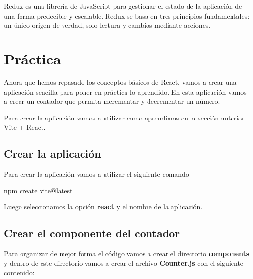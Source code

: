 \documentclass[
  a4paper,
  DIV=11,
  numbers=noendperiod,
  onepage,
  openany]{scrreprt}
\newenvironment{Shaded}{\begin{snugshade}}{\end{snugshade}}
\newcommand{\ExtensionTok}[1]{\textcolor[rgb]{0.00,0.23,0.31}{#1}}
\newcommand{\NormalTok}[1]{\textcolor[rgb]{0.00,0.23,0.31}{#1}}
\begin{document}
Redux es una librería de JavaScript para gestionar el estado de la
aplicación de una forma predecible y escalable. Redux se basa en tres
principios fundamentales: un único origen de verdad, solo lectura y
cambios mediante acciones.

\section{Práctica}\label{pruxe1ctica}

Ahora que hemos repasado los conceptos básicos de React, vamos a crear
una aplicación sencilla para poner en práctica lo aprendido. En esta
aplicación vamos a crear un contador que permita incrementar y
decrementar un número.

Para crear la aplicación vamos a utilizar como aprendimos en la sección
anterior Vite + React.

\subsection{Crear la aplicación}\label{crear-la-aplicaciuxf3n}

Para crear la aplicación vamos a utilizar el siguiente comando:

\begin{Shaded}
\begin{Highlighting}[]
\ExtensionTok{npm}\NormalTok{ create vite@latest}
\end{Highlighting}
\end{Shaded}

Luego seleccionamos la opción \textbf{react} y el nombre de la
aplicación.

\subsection{Crear el componente del
contador}\label{crear-el-componente-del-contador}

Para organizar de mejor forma el código vamos a crear el directorio
\textbf{components} y dentro de este directorio vamos a crear el archivo
\textbf{Counter.js} con el siguiente contenido:
\end{document}
